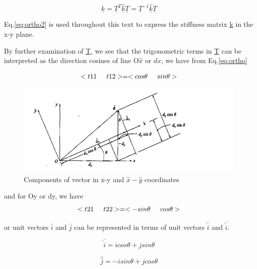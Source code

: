 \documentclass[12pt]{report}
\newcommand{\lab}[1]{
	Eq.\ref{#1}
}
\begin{document}
\begin{equation}
	\underline{k}=\underline{T}^T \hat{\underline{k}}\underline{T}=\underline{T}^{-1}\hat{\underline{k}}\underline{T}
	\label{eq:ortho2}
\end{equation}

\lab{eq:ortho2} is used throughout this text to express the
stiffness matrix \underline{k} in the x-y plane.

By further examination of \underline{T}, we see that the trigonometric terms in
\underline{T} can be interpreted as the direction cosines of line O$\hat{x}$ or
$d{x}$, we have from \lab{eq:ortho}

\begin{equation}
	<{t11}\hspace{0.5cm}{t12}>=<{cos\theta}\hspace{0.5cm}{sin\theta}>
\end{equation}

\begin{figure}
	\includegraphics[scale=0.5]{ortho.PNG}
	\caption{Components of vector in x-y and $\hat{x}-\hat{y}$ coordinates} 
	\label{fig:orthof}
\end{figure}
and for Oy or dy, we have
\begin{equation}
	<{t21}\hspace{0.5cm}{t22}>=<{-sin\theta}\hspace{0.5cm}{cos\theta}>
\end{equation}

or unit vectors $\bar{i}$ and $\bar{j}$ can be represented in terms of
unit vectors $\bar{\hat{i}}$ and $\bar{\hat{i}}$.

\begin{equation}
	\bar{\hat{i}} =icos\theta+jsin\theta
\end{equation}

\begin{equation}
	\bar{\hat{j}} =-isin\theta+jcos\theta
\end{equation}
\end{document}
